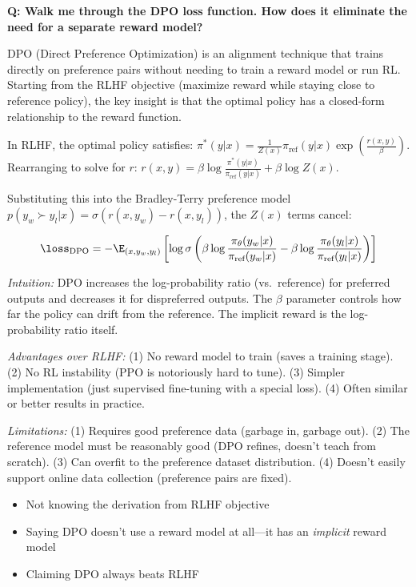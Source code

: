 \begin{interviewq}
\textbf{Q: Walk me through the DPO loss function. How does it eliminate the need for a separate reward model?}

 \quad {} \quad \badgefreq{\freqhigh}

\stronganswer DPO (Direct Preference Optimization) is an alignment technique that trains directly on preference pairs without needing to train a reward model or run RL. Starting from the RLHF objective (maximize reward while staying close to reference policy), the key insight is that the optimal policy has a closed-form relationship to the reward function.

In RLHF, the optimal policy satisfies: $\pi^*(y|x) = \frac{1}{Z(x)} \pi_{\text{ref}}(y|x) \exp\left(\frac{r(x,y)}{\beta}\right)$. Rearranging to solve for $r$: $r(x,y) = \beta \log \frac{\pi^*(y|x)}{\pi_{\text{ref}}(y|x)} + \beta \log Z(x)$.

Substituting this into the Bradley-Terry preference model $p(y_w \succ y_l | x) = \sigma(r(x,y_w) - r(x,y_l))$, the $Z(x)$ terms cancel:

$$\loss_{\text{DPO}} = -\E_{(x, y_w, y_l)}\left[\log \sigma\left(\beta \log \frac{\pi_\theta(y_w|x)}{\pi_{\text{ref}}(y_w|x)} - \beta \log \frac{\pi_\theta(y_l|x)}{\pi_{\text{ref}}(y_l|x)}\right)\right]$$

\textit{Intuition:} DPO increases the log-probability ratio (vs.\ reference) for preferred outputs and decreases it for dispreferred outputs. The $\beta$ parameter controls how far the policy can drift from the reference. The implicit reward is the log-probability ratio itself.

\textit{Advantages over RLHF:} (1) No reward model to train (saves a training stage). (2) No RL instability (PPO is notoriously hard to tune). (3) Simpler implementation (just supervised fine-tuning with a special loss). (4) Often similar or better results in practice.

\textit{Limitations:} (1) Requires good preference data (garbage in, garbage out). (2) The reference model must be reasonably good (DPO refines, doesn't teach from scratch). (3) Can overfit to the preference dataset distribution. (4) Doesn't easily support online data collection (preference pairs are fixed).

\redflags
\begin{itemize}
    \item Not knowing the derivation from RLHF objective
    \item Saying DPO doesn't use a reward model at all---it has an \textit{implicit} reward model
    \item Claiming DPO always beats RLHF
\end{itemize}


\end{interviewq}
